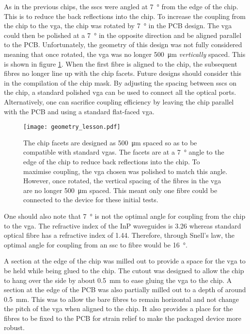 As in the previous chips, the \acp{ssc} were angled at \SI{7}{\degree} from the edge of the chip. This is to reduce the back reflections into the chip. To increase the coupling from the chip to the \ac{vga}, the chip was rotated by \SI{7}{\degree} in the PCB design. The \ac{vga} could then be polished at a \SI{7}{\degree} in the opposite direction and be aligned parallel to the PCB. Unfortunately, the geometry of this design was not fully considered meaning that once rotated, the \ac{vga} was no longer \SI{500}{\um} \textit{vertically} spaced. This is shown in figure \ref{fig:geometry_lesson}. When the first fibre is aligned to the chip, the subsequent fibres no longer line up with the chip facets. Future designs should consider this in the compilation of the chip mask. By adjusting the spacing between \acp{ssc} on the chip, a standard polished \ac{vga} can be used to connect all the optical ports. Alternatively, one can sacrifice coupling efficiency by leaving the chip parallel with the PCB and using a standard flat-faced \ac{vga}.


\begin{figure}[t]
	\centering
	\texttt{[image: geometry\_lesson.pdf]}
	\caption[A quick lesson in geometry for edge coupling]{The chip facets are designed as \SI{500}{\um} spaced so as to be compatible with standard \acsp{vga}. The facets are at a \SI{7}{\degree} angle to the edge of the chip to reduce back reflections into the chip. To maximise coupling, the \acs{vga} chosen was polished to match this angle. However, once rotated, the vertical spacing of the fibres in the \acs{vga} are no longer \SI{500}{\um} spaced. This meant only one fibre could be connected to the device for these initial tests.}
	\label{fig:geometry_lesson}
\end{figure}

One should also note that \SI{7}{\degree} is not the optimal angle for coupling from the chip to the \ac{vga}. The refractive index of the \ac{InP} waveguides is 3.26 whereas standard optical fibre has a refractive index of 1.44. Therefore, through Snell's law, the optimal angle for coupling from an \ac{ssc} to fibre would be \SI{16}{\degree}. 

A section at the edge of the chip was milled out to provide a space for the \ac{vga} to be held while being glued to the chip. The cutout was designed to allow the chip to hang over the side by about \SI{0.5}{\mm} to ease gluing the \ac{vga} to the chip. A section at the edge of the PCB was also partially milled out to a depth of around \SI{0.5}{\mm}. This was to allow the bare fibres to remain horizontal and not change the pitch of the \ac{vga} when aligned to the chip. It also provides a place for the fibres to be fixed to the PCB for strain relief to make the packaged device more robust.

